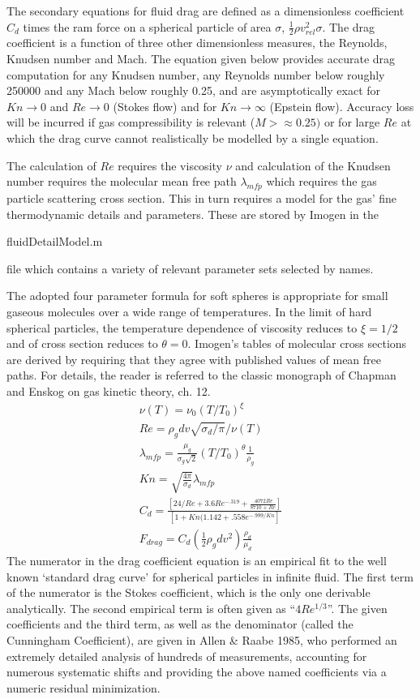 \documentclass[letterpaper,12pt]{article}
\begin{document}
The secondary equations for fluid drag are defined as a dimensionless coefficient $C_d$ times the 
ram force on a spherical particle of area $\sigma$, $\frac{1}{2} \rho v_{rel}^2 \sigma$.
The drag coefficient is a function of three other dimensionless measures, the Reynolds, Knudsen number
and Mach. The equation given below provides accurate drag computation for any Knudsen number,
any Reynolds number below roughly 250000 and any Mach below roughly 0.25, and are asymptotically
exact for $Kn \rightarrow 0$ and $Re \rightarrow 0$ (Stokes flow) and for $Kn \rightarrow \infty$ (Epstein flow).
Accuracy loss will be incurred if gas compressibility is relevant ($M > \approx 0.25)$ or for large $Re$
at which the drag curve cannot realistically be modelled by a single equation.

The calculation of $Re$ requires the viscosity $\nu$ and calculation of the Knudsen number requires the
molecular mean free path $\lambda_{mfp}$ which requires the gas particle scattering cross section.
This in turn requires a model for the gas' fine thermodynamic details and parameters. These are stored 
by Imogen in the \begin{tt}fluidDetailModel.m\end{tt} file which contains a variety of relevant parameter
sets selected by names.

The adopted four parameter formula for soft spheres is appropriate for small gaseous molecules over a wide
range of temperatures. In the limit of hard spherical particles, the temperature dependence of viscosity
reduces to $\xi=1/2$ and of cross section reduces to $\theta=0$. Imogen's tables of molecular cross sections
are derived by requiring that they agree with published values of mean free paths.
For details, the reader is referred to the
classic monograph of Chapman and Enskog on gas kinetic theory, ch. 12.
\begin{align*}
\nu(T) = \nu_0 (T/T_0)^\xi \\
Re = \rho_g dv \sqrt{\sigma_d / \pi} / \nu(T) \\
\lambda_{mfp} = \frac{\mu_g}{\sigma_g \sqrt{2}} (T/T_0)^\theta \frac{1}{\rho_g} \\
Kn = \sqrt{\frac{4 \pi}{\sigma_d}} \lambda_{mfp} \\
C_d = \frac{\left[ 24 / Re + 3.6 Re^{-.319} + \frac{.4072 Re}{8710 + Re} \right]}{\left[1 + Kn(1.142 + .558 e^{-.999/Kn} \right] } \\
F_{drag} = C_d (\frac{1}{2}\rho_g dv^2)\frac{\rho_d}{\mu_d}
\end{align*}
The numerator in the drag coefficient equation is an empirical fit to the well known `standard drag curve'
for spherical particles in infinite fluid. The first term of the numerator is the Stokes coefficient, which is the
only one derivable analytically. The second empirical term is often given as ``$4 Re^{1/3}$''. The given coefficients
and the third term, as well as the denominator (called the Cunningham Coefficient), are given in Allen \& Raabe 1985,
who performed an extremely detailed analysis of hundreds of measurements, accounting for numerous systematic shifts 
and providing the above named coefficients via a numeric residual minimization.
\end{document}
